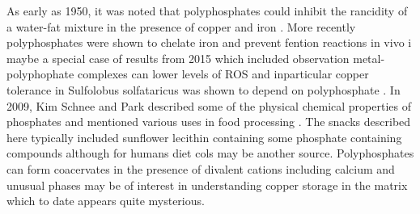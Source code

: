 {As early as 1950, it was noted that polyphosphates could
inhibit the rancidity of a water-fat mixture in the presence of
copper and iron
\cite{Watts_Polyphosphates_synergistic_antioxidants_1950}.
More recently polyphosphates were shown to chelate iron
and prevent fention reactions in vivo
\cite{EduardoAGroisman_Polyphosphate_Functions_2020}i
maybe a special case of results from
2015 which included observation  metal-polyphophate
 complexes can lower levels of ROS
\cite{Gray_Jakob_Oxidative_stress_protection_2015}
and inparticular copper tolerance in Sulfolobus solfataricus
was shown to depend on polyphosphate
\cite{Soto_Recalde_Orell_Global_effect_2019}
.
In 2009, Kim Schnee and Park described some of the physical
chemical properties of phosphates and mentioned various uses
in food processing \cite{KIM_SCHNEE_PARK_CHEMICAL_FUNCTIONAL_PROPERTIES_2009}.
The snacks described here typically included sunflower lecithin
containing some phosphate containing compounds although for humans
diet cols may be another source. 
Polyphosphates can form coacervates in the presence of 
divalent cations including calcium
\cite{Momeni_Filiaggi_Rheology_polyphosphate_coacervates_2016} and
unusual phases may be of interest in understanding copper storage
in the matrix which to date appears quite mysterious. 



} %
